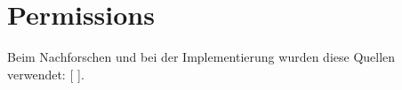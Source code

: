 \documentclass[FIPLY_base.tex]{subfiles}
\author{Andreas Denkmayr}
\date{25. Februar 2016}
\begin{document}
\section{Permissions}
Beim Nachforschen und bei der Implementierung wurden diese Quellen verwendet: [\citetitle{} \cite{}]. 
\end{document}
